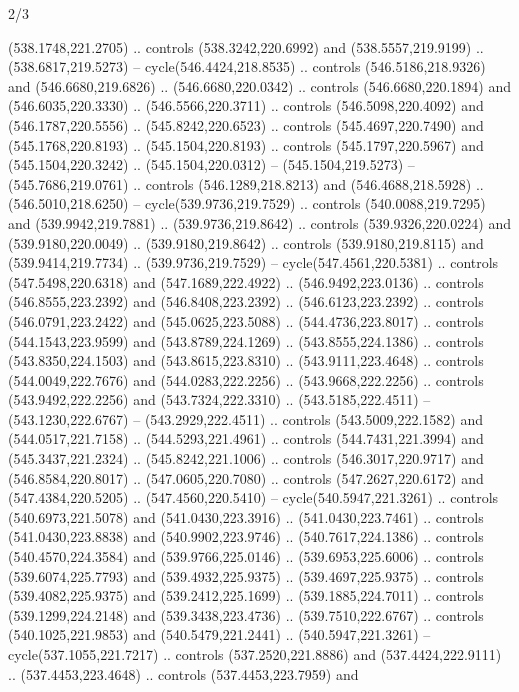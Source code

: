 \begin{flagdescription}{2/3}
\begin{scope}[xshift=0.5\flaglength,yshift=0.5\flagwidth,scale=\flagwidth/495.65]
\begin{scope}[y=0.8pt, x=0.8pt, yscale=-1,shift={(-463.76,-309.78)}]
  (538.1748,221.2705) .. controls (538.3242,220.6992) and (538.5557,219.9199) ..
  (538.6817,219.5273) -- cycle(546.4424,218.8535) .. controls
  (546.5186,218.9326) and (546.6680,219.6826) .. (546.6680,220.0342) .. controls
  (546.6680,220.1894) and (546.6035,220.3330) .. (546.5566,220.3711) .. controls
  (546.5098,220.4092) and (546.1787,220.5556) .. (545.8242,220.6523) .. controls
  (545.4697,220.7490) and (545.1768,220.8193) .. (545.1504,220.8193) .. controls
  (545.1797,220.5967) and (545.1504,220.3242) .. (545.1504,220.0312) --
  (545.1504,219.5273) -- (545.7686,219.0761) .. controls (546.1289,218.8213) and
  (546.4688,218.5928) .. (546.5010,218.6250) -- cycle(539.9736,219.7529) ..
  controls (540.0088,219.7295) and (539.9942,219.7881) .. (539.9736,219.8642) ..
  controls (539.9326,220.0224) and (539.9180,220.0049) .. (539.9180,219.8642) ..
  controls (539.9180,219.8115) and (539.9414,219.7734) .. (539.9736,219.7529) --
  cycle(547.4561,220.5381) .. controls (547.5498,220.6318) and
  (547.1689,222.4922) .. (546.9492,223.0136) .. controls (546.8555,223.2392) and
  (546.8408,223.2392) .. (546.6123,223.2392) .. controls (546.0791,223.2422) and
  (545.0625,223.5088) .. (544.4736,223.8017) .. controls (544.1543,223.9599) and
  (543.8789,224.1269) .. (543.8555,224.1386) .. controls (543.8350,224.1503) and
  (543.8615,223.8310) .. (543.9111,223.4648) .. controls (544.0049,222.7676) and
  (544.0283,222.2256) .. (543.9668,222.2256) .. controls (543.9492,222.2256) and
  (543.7324,222.3310) .. (543.5185,222.4511) -- (543.1230,222.6767) --
  (543.2929,222.4511) .. controls (543.5009,222.1582) and (544.0517,221.7158) ..
  (544.5293,221.4961) .. controls (544.7431,221.3994) and (545.3437,221.2324) ..
  (545.8242,221.1006) .. controls (546.3017,220.9717) and (546.8584,220.8017) ..
  (547.0605,220.7080) .. controls (547.2627,220.6172) and (547.4384,220.5205) ..
  (547.4560,220.5410) -- cycle(540.5947,221.3261) .. controls
  (540.6973,221.5078) and (541.0430,223.3916) .. (541.0430,223.7461) .. controls
  (541.0430,223.8838) and (540.9902,223.9746) .. (540.7617,224.1386) .. controls
  (540.4570,224.3584) and (539.9766,225.0146) .. (539.6953,225.6006) .. controls
  (539.6074,225.7793) and (539.4932,225.9375) .. (539.4697,225.9375) .. controls
  (539.4082,225.9375) and (539.2412,225.1699) .. (539.1885,224.7011) .. controls
  (539.1299,224.2148) and (539.3438,223.4736) .. (539.7510,222.6767) .. controls
  (540.1025,221.9853) and (540.5479,221.2441) .. (540.5947,221.3261) --
  cycle(537.1055,221.7217) .. controls (537.2520,221.8886) and
  (537.4424,222.9111) .. (537.4453,223.4648) .. controls (537.4453,223.7959) and

\end{scope}
\end{scope}
\end{flagdescription}
